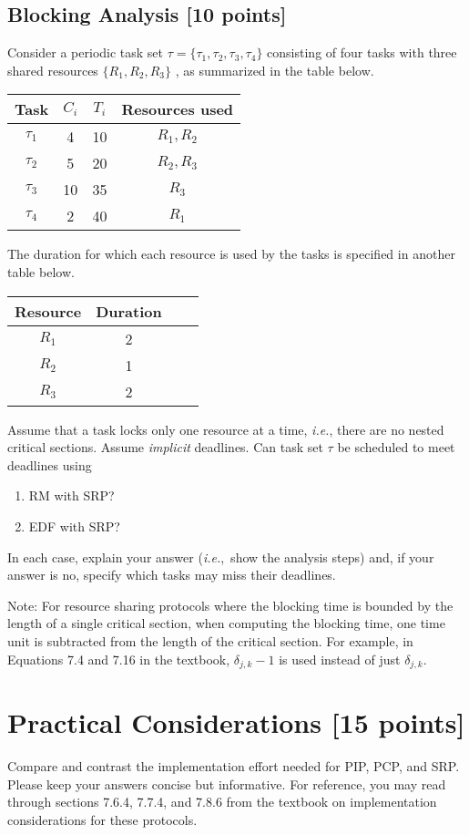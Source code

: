 \documentclass[12pt]{article}
\newcommand{\ie}{{\textit{i.e.}}}
\begin{document}
\subsection{Blocking Analysis [10 points]}

Consider a periodic task set $\tau = \{\tau_1, \tau_2, \tau_3, \tau_4\}$
consisting of four tasks with three shared
resources $\{R_1, R_2, R_3\}$ , as summarized in the table below.
\begin{table}[h]
\begin{center}
\begin{tabular}{cccc}
\toprule
Task & $C_{i}$ & $T_{i}$ & Resources used \\ 
  \midrule
$\tau_{1}$ & 4 & 10 & $R_{1}, R_{2}$ \\
$\tau_{2}$ & 5 & 20 & $R_{2}, R_{3}$ \\
$\tau_{3}$ & 10 & 35 & $R_{3}$ \\
$\tau_{4}$ & 2 & 40 & $R_{1}$ \\ 
  \bottomrule
\end{tabular}
\end{center}
\end{table}
The duration for which each resource is used by the tasks is specified in
another table below.
\begin{table}[h]
\begin{center}
\begin{tabular}{cccc}
\toprule
Resource & Duration \\ \midrule
$R_{1}$ & 2 \\
$R_{2}$ & 1 \\
$R_{3}$ & 2 \\
\bottomrule
\end{tabular}
\end{center}
\end{table}
Assume that a task locks only one resource at a time,
\ie, there are no nested critical sections. Assume \emph{implicit} deadlines.
Can task set $\tau$ be scheduled to meet deadlines using
\begin{enumerate}
\item RM with SRP?
\item EDF with SRP?
\end{enumerate}
In each case, explain your answer (\ie,~show the analysis steps)
and, if your answer is no, specify which tasks may miss their deadlines.

Note: For resource sharing protocols where the blocking time is bounded by the
length of a single critical section, when computing the blocking time,
one time unit is subtracted from the length of the critical section.
For example, in Equations 7.4 and 7.16 in the textbook, $\delta_{j,k} - 1$ is
used instead of just $\delta_{j, k}$. 

\section{Practical Considerations [15 points]}

Compare and contrast the implementation effort needed for PIP, PCP, and SRP.
Please keep your answers concise but informative. For reference, you may read
through sections 7.6.4, 7.7.4, and 7.8.6 from the textbook on implementation
considerations for these protocols.
\end{document}
